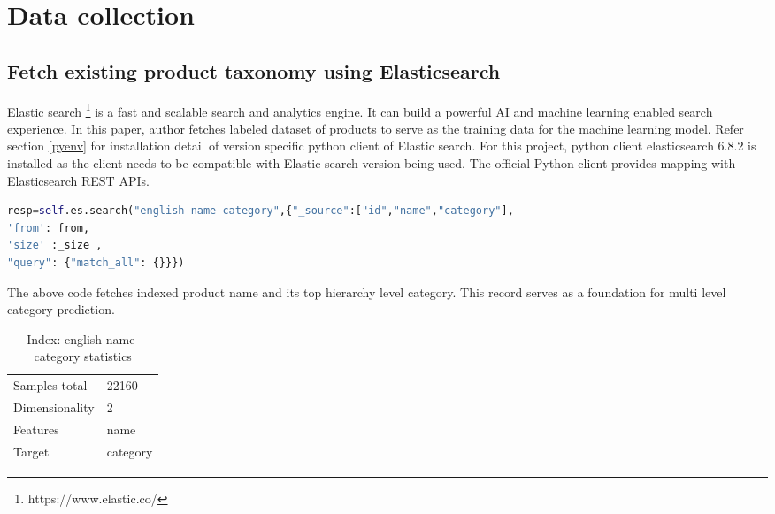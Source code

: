 \chapter{Data collection}




\section {Fetch existing product taxonomy using Elasticsearch}
Elastic search \footnote{https://www.elastic.co/} is a fast and scalable search and analytics engine. It can build a powerful AI and machine learning enabled search experience. In this paper, author fetches labeled dataset of products to serve as the training data for the machine learning model.
Refer section \ref {pyenv} for installation detail of version specific python client of Elastic search. For this project, python client elasticsearch 6.8.2 is installed as the client needs to be compatible with Elastic search version being used. The official Python client provides mapping with Elasticsearch REST APIs.

\begin{lstlisting}[language=Python]
resp=self.es.search("english-name-category",{"_source":["id","name","category"],
'from':_from,
'size' :_size ,
"query": {"match_all": {}}})
\end{lstlisting}

The above code fetches indexed product name and its top hierarchy level category. This record serves as a foundation for multi level category prediction.  

\begin{table}[h]
      \caption{Index: english-name-category statistics}
      \centering
      \label{table:enc}
\begin{tabular}{ll}
      \toprule 

      Samples total&22160 \\
      Dimensionality&2 \\
      Features&name \\
      Target&category \\
      
      \bottomrule
\end{tabular}
\end{table}

